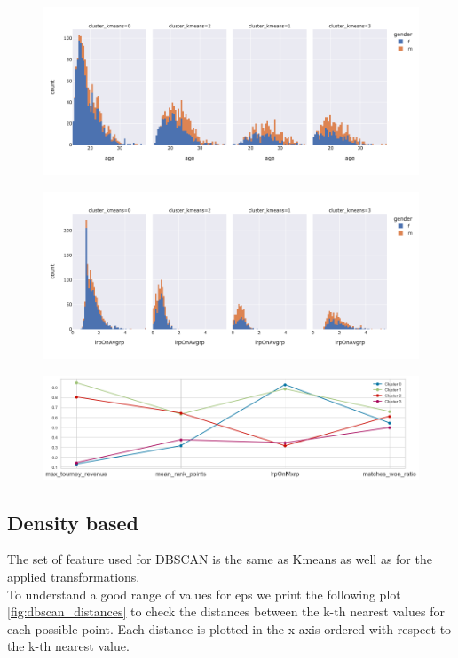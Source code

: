 \documentclass{article}
\begin{document}
\begin{figure}
\centering
\begin{minipage}{.5\textwidth}
\centering
\includegraphics[width=\textwidth]{plots/kmeans/hist_age.png}
\label{fig:age_kmeans}
\end{minipage}%
\begin{minipage}{.5\textwidth}
\centering
\includegraphics[width=\textwidth]{plots/kmeans/hist_lrpOnAvgrp.png}
\label{fig:lrpOnAvgrp_kmeans}
\end{minipage}
\end{figure}

\begin{figure}[h]
\centering
\includegraphics[width=\textwidth]{plots/kmeans/kmeans_results}
\label{fig:kmeans_results}
\end{figure}



\newpage

\subsection{Density based}
The set of feature used for DBSCAN is the same as Kmeans as well as for the applied transformations.\\
To understand a good range of values for eps we print the following plot \ref{fig:dbscan_distances} to check the distances between the k-th nearest values for each possible point. Each distance is plotted in the x axis ordered with respect to the k-th nearest value.
\end{document}
